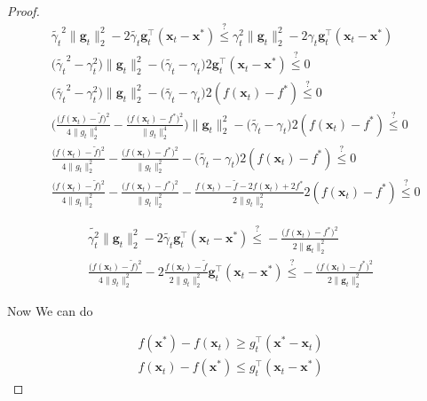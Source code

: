 \documentclass{article}
\begin{document}
\begin{proof}
	\begin{align}
		& \tilde{\gamma_t}^2 \|\mathbf{g}_t\|^2_2 - 2\tilde{\gamma_t} \mathbf{g}_t^\top(\mathbf{x}_t-\mathbf{x}^*)  \stackrel{?}{\le} \gamma_t^2 \|\mathbf{g}_t\|^2_2 - 2\gamma_t \mathbf{g}_t^\top(\mathbf{x}_t-\mathbf{x}^*)\\
		& \big( \tilde{\gamma_t}^2 - \gamma_t^2 \big) \|\mathbf{g}_t\|^2_2 - \big(\tilde{\gamma_t} - \gamma_t \big) 2\mathbf{g}_t^\top(\mathbf{x}_t-\mathbf{x}^*)  \stackrel{?}{\le} 0\\
		& \big( \tilde{\gamma_t}^2 - \gamma_t^2 \big) \|\mathbf{g}_t\|^2_2 - \big(\tilde{\gamma_t} - \gamma_t \big) 2(f(\mathbf{x}_t) - f^*)  \stackrel{?}{\le} 0\\
		& \bigg( \frac{\big(f(\mathbf{x}_t) - \tilde{f}\big)^2}{4\|g_t\|^4_2} -\frac{\big(f(\mathbf{x}_t) - f^*\big)^2}{\|g_t\|^4_2} \bigg) \|\mathbf{g}_t\|^2_2 - \big(\tilde{\gamma_t} - \gamma_t \big) 2(f(\mathbf{x}_t) - f^*)  \stackrel{?}{\le} 0\\
		& \frac{\big(f(\mathbf{x}_t) - \tilde{f}\big)^2}{4\|g_t\|^2_2} -\frac{\big(f(\mathbf{x}_t) - f^*\big)^2}{\|g_t\|^2_2}  - \big(\tilde{\gamma_t} - \gamma_t \big) 2(f(\mathbf{x}_t) - f^*)  \stackrel{?}{\le} 0\\
		& \frac{\big(f(\mathbf{x}_t) - \tilde{f}\big)^2}{4\|g_t\|^2_2} -\frac{\big(f(\mathbf{x}_t) - f^*\big)^2}{\|g_t\|^2_2}  - \frac{f(\mathbf{x}_t) - \tilde{f} - 2f(\mathbf{x}_t) + 2f^*}{2\|g_t\|^2_2} 2(f(\mathbf{x}_t) - f^*)  \stackrel{?}{\le} 0
	\end{align}
	
	\begin{align}
		\tilde{\gamma_t^2} \|\mathbf{g}_t\|^2_2 - 2\tilde{\gamma_t} \mathbf{g}_t^\top(\mathbf{x}_t-\mathbf{x}^*) \stackrel{?}{\le} -\frac{\big(f(\mathbf{x}_t)-f^*\big)^2}{2\|\mathbf{g}_t\|^2_2}\\
		 \frac{\big(f(\mathbf{x}_t) - \tilde{f}\big)^2}{4\|g_t\|^2_2} - 2 \frac{f(\mathbf{x}_t) - \tilde{f}}{2\|g_t\|^2_2} \mathbf{g}_t^\top(\mathbf{x}_t-\mathbf{x}^*) \stackrel{?}{\le} -\frac{\big(f(\mathbf{x}_t)-f^*\big)^2}{2\|\mathbf{g}_t\|^2_2}
	\end{align}
	
	Now We can do
	
	\begin{align}
		f(\mathbf{x}^*) -  f(\mathbf{x}_t) \ge  g_t^\top (\mathbf{x}^* - \mathbf{x}_t)\\
		f(\mathbf{x}_t) - f(\mathbf{x}^*) \le  g_t^\top ( \mathbf{x}_t - \mathbf{x}^* )
	\end{align}
	

\end{proof}
\end{document}
